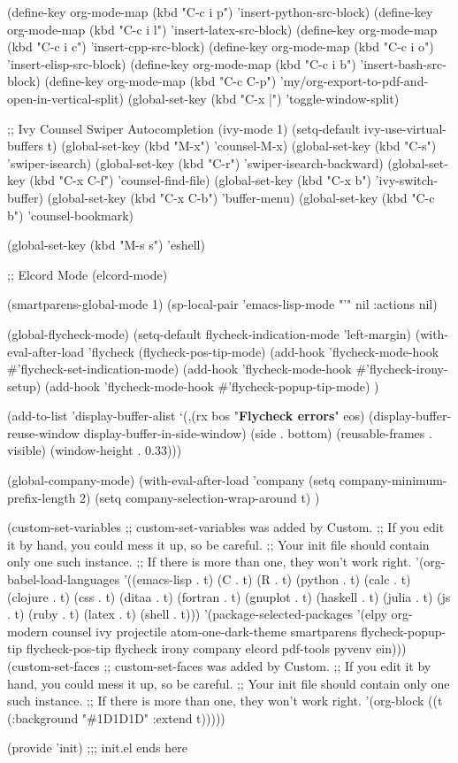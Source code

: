 \documentclass[11pt]{article}
\begin{document}
(define-key org-mode-map (kbd "C-c i p") 'insert-python-src-block)
(define-key org-mode-map (kbd "C-c i l") 'insert-latex-src-block)
(define-key org-mode-map (kbd "C-c i c") 'insert-cpp-src-block)
(define-key org-mode-map (kbd "C-c i o") 'insert-elisp-src-block)
(define-key org-mode-map (kbd "C-c i b") 'insert-bash-src-block)
(define-key org-mode-map (kbd "C-c C-p") 'my/org-export-to-pdf-and-open-in-vertical-split)
(global-set-key (kbd "C-x |") 'toggle-window-split)

;; Ivy Counsel Swiper Autocompletion
(ivy-mode 1)
(setq-default ivy-use-virtual-buffers t)
(global-set-key (kbd "M-x") 'counsel-M-x)
(global-set-key (kbd "C-s") 'swiper-isearch)
(global-set-key (kbd "C-r") 'swiper-isearch-backward)
(global-set-key (kbd "C-x C-f") 'counsel-find-file)
(global-set-key (kbd "C-x b") 'ivy-switch-buffer)
(global-set-key (kbd "C-x C-b") 'buffer-menu)
(global-set-key (kbd "C-c b") 'counsel-bookmark)

(global-set-key (kbd "M-s s") 'eshell)

;; Elcord Mode
(elcord-mode)

(smartparens-global-mode 1)
(sp-local-pair 'emacs-lisp-mode "'" nil :actions nil)

(global-flycheck-mode)
(setq-default flycheck-indication-mode 'left-margin)
(with-eval-after-load 'flycheck
  (flycheck-pos-tip-mode)
  (add-hook 'flycheck-mode-hook \#'flycheck-set-indication-mode)
  (add-hook 'flycheck-mode-hook \#'flycheck-irony-setup)
  (add-hook 'flycheck-mode-hook \#'flycheck-popup-tip-mode)
  )

(add-to-list 'display-buffer-alist
             `(,(rx bos "\textbf{Flycheck errors}" eos)
              (display-buffer-reuse-window
               display-buffer-in-side-window)
              (side            . bottom)
              (reusable-frames . visible)
              (window-height   . 0.33)))


(global-company-mode)
(with-eval-after-load 'company
  (setq company-minimum-prefix-length 2)
  (setq company-selection-wrap-around t)
  )

(custom-set-variables
 ;; custom-set-variables was added by Custom.
 ;; If you edit it by hand, you could mess it up, so be careful.
 ;; Your init file should contain only one such instance.
 ;; If there is more than one, they won't work right.
 '(org-babel-load-languages
   '((emacs-lisp . t)
	 (C . t)
	 (R . t)
	 (python . t)
	 (calc . t)
	 (clojure . t)
	 (css . t)
	 (ditaa . t)
	 (fortran . t)
	 (gnuplot . t)
	 (haskell . t)
	 (julia . t)
	 (js . t)
	 (ruby . t)
	 (latex . t)
	 (shell . t)))
 '(package-selected-packages
   '(elpy org-modern counsel ivy projectile atom-one-dark-theme smartparens flycheck-popup-tip flycheck-pos-tip flycheck irony company elcord pdf-tools pyvenv ein)))
(custom-set-faces
 ;; custom-set-faces was added by Custom.
 ;; If you edit it by hand, you could mess it up, so be careful.
 ;; Your init file should contain only one such instance.
 ;; If there is more than one, they won't work right.
 '(org-block ((t (:background "\#1D1D1D" :extend t)))))

(provide 'init)
;;; init.el ends here
\end{document}
